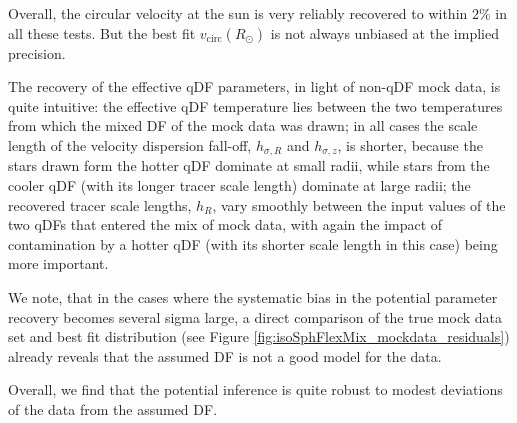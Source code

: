 Overall, the circular velocity at the sun is very reliably recovered to within $2\%$ in all these tests. But the best fit $v_\text{circ}(R_\odot)$ is not always unbiased at the implied precision.

The recovery of the effective qDF parameters, in light of non-qDF mock data, is quite intuitive: the effective qDF temperature lies between the two temperatures from which the mixed DF of the mock data was drawn; in all cases the scale length of the velocity dispersion fall-off, $h_{\sigma,R}$ and $h_{\sigma,z}$, is shorter, because the stars drawn form the hotter qDF dominate at small radii, while stars from the cooler qDF (with its longer tracer scale length) dominate at large radii; the recovered tracer scale lengths, $h_R$, vary smoothly between the input values of the two qDFs that entered the mix of mock data, with again the impact of contamination by a hotter qDF (with its shorter scale length in this case) being more important. 

We note, that in the cases where the systematic bias in the potential parameter recovery becomes several sigma large, a direct comparison of the true mock data set and best fit distribution (see Figure \ref{fig:isoSphFlexMix_mockdata_residuals}) already reveals that the assumed DF is not a good model for the data.

Overall, we find that the potential inference is quite robust to modest deviations of the data from the assumed DF. 


